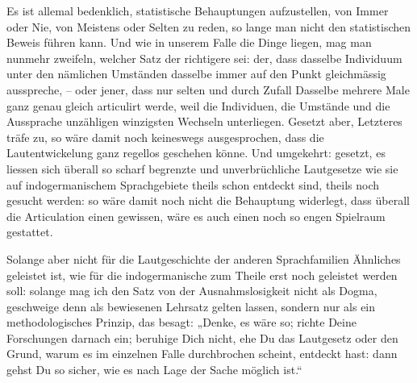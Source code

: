 {Es ist allemal bedenklich, statistische Behauptungen aufzustellen, von Immer oder Nie, von Meistens oder Selten zu reden, so lange man nicht den statistischen Beweis führen kann. Und wie in unserem Falle die Dinge liegen, mag man nunmehr zweifeln, welcher Satz der richtigere sei: der, dass dasselbe Individuum unter den nämlichen Umständen dasselbe immer auf den Punkt gleich\label{sp.189}mässig ausspreche, – oder jener, dass nur selten und durch Zufall Dasselbe mehrere Male ganz genau gleich articulirt werde, weil die Individuen, die Umstände und die Aussprache unzähligen winzigsten Wechseln unterliegen. Gesetzt aber, Letzteres träfe zu, so wäre damit noch keineswegs ausgesprochen, dass die \label{fp.200} Lautentwickelung ganz regellos geschehen könne. Und umgekehrt: gesetzt, es liessen sich überall so scharf begrenzte und unverbrüchliche Lautgesetze  wie sie auf indogermanischem Sprachgebiete theils schon entdeckt sind, theils noch gesucht werden: so wäre damit noch nicht die Behauptung widerlegt, dass überall die Articulation einen gewissen, wäre es auch einen noch so engen Spielraum gestattet.

Solange aber nicht für die Lautgeschichte der anderen Sprachfamilien Ähnliches geleistet ist, wie für die indogermanische zum Theile erst noch geleistet werden soll: solange mag ich den Satz von der Ausnahmslosigkeit nicht als Dogma, geschweige denn als bewiesenen Lehrsatz gelten lassen, sondern nur als ein methodologisches Prinzip, das besagt: „Denke, es wäre so; richte Deine Forschungen darnach ein; beruhige Dich nicht, ehe Du das Lautgesetz oder den Grund, warum es im einzelnen Falle durchbrochen scheint, entdeckt hast: dann gehst Du so sicher, wie es nach Lage der Sache möglich ist.“ 

}
